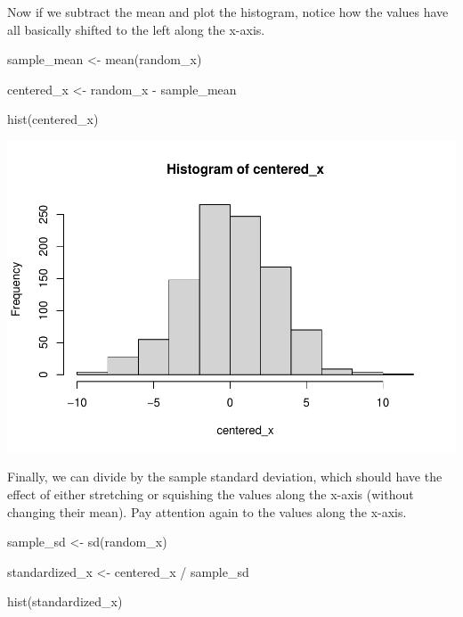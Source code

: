 \documentclass[
]{book}
\newenvironment{Shaded}{\begin{snugshade}}{\end{snugshade}}
\newcommand{\FunctionTok}[1]{\textcolor[rgb]{0.00,0.00,0.00}{#1}}
\newcommand{\NormalTok}[1]{#1}
\newcommand{\OtherTok}[1]{\textcolor[rgb]{0.56,0.35,0.01}{#1}}
\newcommand{\SpecialCharTok}[1]{\textcolor[rgb]{0.00,0.00,0.00}{#1}}
\begin{document}
Now if we subtract the mean and plot the histogram, notice how the values have all basically shifted to the left along the x-axis.

\begin{Shaded}
\begin{Highlighting}[]
\NormalTok{sample\_mean }\OtherTok{\textless{}{-}} \FunctionTok{mean}\NormalTok{(random\_x)}

\NormalTok{centered\_x }\OtherTok{\textless{}{-}}\NormalTok{ random\_x }\SpecialCharTok{{-}}\NormalTok{ sample\_mean}

\FunctionTok{hist}\NormalTok{(centered\_x)}
\end{Highlighting}
\end{Shaded}

\includegraphics{test_course_notes_files/figure-latex/unnamed-chunk-75-1.pdf}

Finally, we can divide by the sample standard deviation, which should have the effect of either stretching or squishing the values along the x-axis (without changing their mean). Pay attention again to the values along the x-axis.

\begin{Shaded}
\begin{Highlighting}[]
\NormalTok{sample\_sd }\OtherTok{\textless{}{-}} \FunctionTok{sd}\NormalTok{(random\_x)}

\NormalTok{standardized\_x }\OtherTok{\textless{}{-}}\NormalTok{ centered\_x }\SpecialCharTok{/}\NormalTok{ sample\_sd}

\FunctionTok{hist}\NormalTok{(standardized\_x)}
\end{Highlighting}
\end{Shaded}
\end{document}
